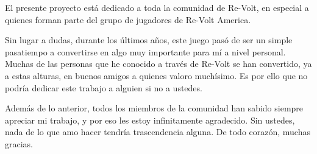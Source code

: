 El presente proyecto está dedicado a toda la comunidad de Re-Volt, en especial a quienes forman parte del grupo de jugadores de Re-Volt America.

Sin lugar a dudas, durante los últimos años, este juego pasó de ser un simple pasatiempo a convertirse en algo muy importante para mí a nivel personal. Muchas de las personas que he conocido a través de Re-Volt se han convertido, ya a estas alturas, en buenos amigos a quienes valoro muchísimo. Es por ello que no podría dedicar este trabajo a alguien si no a ustedes.

Además de lo anterior, todos los miembros de la comunidad han sabido siempre apreciar mi trabajo, y por eso les estoy infinitamente agradecido. Sin ustedes, nada de lo que amo hacer tendría trascendencia alguna. De todo corazón, muchas gracias.
